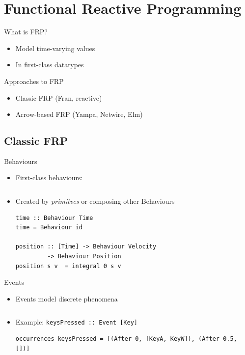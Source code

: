 \documentclass{beamer}
\begin{document}
    \section{Functional Reactive Programming}
    \begin{frame}{What is FRP?}
        \begin{itemize}
            \item<+-> Model time-varying values
            \item<+-> In first-class datatypes
        \end{itemize}
    \end{frame}
    
    \begin{frame}{Approaches to FRP}
            \begin{itemize}
            \item Classic FRP (Fran, reactive) 
            \item Arrow-based FRP (Yampa, Netwire, Elm)
        \end{itemize}
    \end{frame}
    
    \subsection{Classic FRP}
    
\begin{frame}[fragile]{Behaviours}
\begin{itemize}
\item First-class behaviours:
\inputminted{haskell}{Behaviour.hs}
\item Created by \emph{primitves} or composing other Behaviours
\begin{verbatim}
time :: Behaviour Time
time = Behaviour id

position :: [Time] -> Behaviour Velocity 
         -> Behaviour Position
position s v  = integral 0 s v
\end{verbatim}
\end{itemize}

\end{frame}

\begin{frame}[fragile]{Events}
\begin{itemize}
\item Events model discrete phenomena
\inputminted{haskell}{Event.hs}
\item Example: \texttt{keysPressed :: Event [Key]}
\begin{verbatim}
occurrences keysPressed = [(After 0, [KeyA, KeyW]), (After 0.5, [])]
\end{verbatim}
\end{itemize}
\end{frame}
\end{document}
